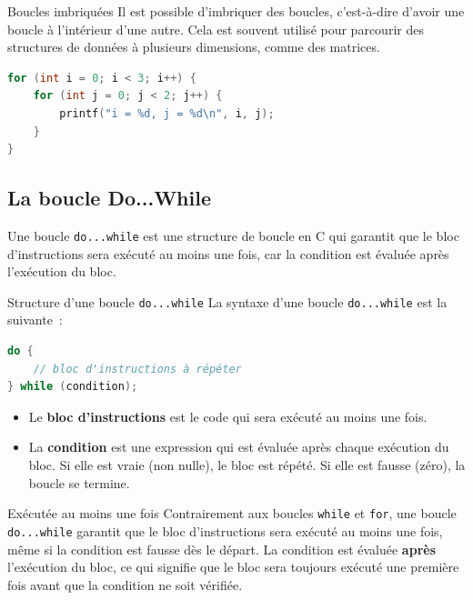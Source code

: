 \begin{UPSTIinfor}{Boucles imbriquées}
	Il est possible d'imbriquer des boucles, c'est-à-dire d'avoir une boucle à l'intérieur d'une autre. Cela est souvent utilisé pour parcourir des structures de données à plusieurs dimensions, comme des matrices.
	\begin{lstlisting}[language=c]
for (int i = 0; i < 3; i++) {
    for (int j = 0; j < 2; j++) {
        printf("i = %d, j = %d\n", i, j);
    }
}
\end{lstlisting}
\end{UPSTIinfor}


\subsection{La boucle Do...While}
Une boucle \texttt{do...while} est une structure de boucle en C qui garantit que le bloc d'instructions sera exécuté au moins une fois, car la condition est évaluée après l'exécution du bloc.

\begin{UPSTIinfor}{Structure d'une boucle \texttt{do...while}}
	La syntaxe d'une boucle \texttt{do...while} est la suivante :
	\begin{lstlisting}[language=c]
do {
    // bloc d'instructions à répéter
} while (condition);
\end{lstlisting}
	\begin{itemize}
		\item Le \textbf{bloc d'instructions} est le code qui sera exécuté au moins une fois.
		\item La \textbf{condition} est une expression qui est évaluée après chaque exécution du bloc. Si elle est vraie (non nulle), le bloc est répété. Si elle est fausse (zéro), la boucle se termine.
	\end{itemize}
\end{UPSTIinfor}

\begin{UPSTIwarning}{Exécutée au moins une fois}
	Contrairement aux boucles \texttt{while} et \texttt{for}, une boucle \texttt{do...while} garantit que le bloc d'instructions sera exécuté au moins une fois, même si la condition est fausse dès le départ.
	La condition est évaluée \textbf{après} l'exécution du bloc, ce qui signifie que le bloc sera toujours exécuté une première fois avant que la condition ne soit vérifiée.
\end{UPSTIwarning}